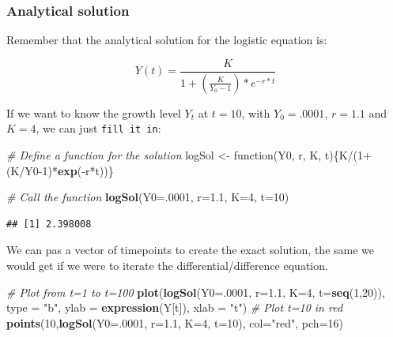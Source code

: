 \documentclass[]{book}
\newenvironment{Shaded}{\begin{snugshade}}{\end{snugshade}}
\newcommand{\KeywordTok}[1]{\textcolor[rgb]{0.13,0.29,0.53}{\textbf{{#1}}}}
\newcommand{\DataTypeTok}[1]{\textcolor[rgb]{0.13,0.29,0.53}{{#1}}}
\newcommand{\DecValTok}[1]{\textcolor[rgb]{0.00,0.00,0.81}{{#1}}}
\newcommand{\FloatTok}[1]{\textcolor[rgb]{0.00,0.00,0.81}{{#1}}}
\newcommand{\StringTok}[1]{\textcolor[rgb]{0.31,0.60,0.02}{{#1}}}
\newcommand{\CommentTok}[1]{\textcolor[rgb]{0.56,0.35,0.01}{\textit{{#1}}}}
\newcommand{\NormalTok}[1]{{#1}}
\begin{document}
\subsubsection*{Analytical solution}\label{analytical-solution}

Remember that the analytical solution for the logistic equation is:

\[
Y(t)  =  \frac{K}{1 + \left(\frac{K}{Y_{0} - 1}\right) * e^{-r*t} }
\]

If we want to know the growth level \(Y_t\) at \(t=10\), with
\(Y_0=.0001\), \(r=1.1\) and \(K=4\), we can just \texttt{fill\ it\ in}:

\begin{Shaded}
\begin{Highlighting}[]
\CommentTok{# Define a function for the solution}
\NormalTok{logSol <-}\StringTok{ }\NormalTok{function(Y0, r, K, t)\{K/(}\DecValTok{1}\NormalTok{+(K/Y0}\DecValTok{-1}\NormalTok{)*}\KeywordTok{exp}\NormalTok{(-r*t))\}}

\CommentTok{# Call the function}
\KeywordTok{logSol}\NormalTok{(}\DataTypeTok{Y0=}\NormalTok{.}\DecValTok{0001}\NormalTok{, }\DataTypeTok{r=}\FloatTok{1.1}\NormalTok{, }\DataTypeTok{K=}\DecValTok{4}\NormalTok{, }\DataTypeTok{t=}\DecValTok{10}\NormalTok{)}
\end{Highlighting}
\end{Shaded}

\begin{verbatim}
## [1] 2.398008
\end{verbatim}

We can pas a vector of timepoints to create the exact solution, the same
we would get if we were to iterate the differential/difference equation.

\begin{Shaded}
\begin{Highlighting}[]
\CommentTok{# Plot from t=1 to t=100}
\KeywordTok{plot}\NormalTok{(}\KeywordTok{logSol}\NormalTok{(}\DataTypeTok{Y0=}\NormalTok{.}\DecValTok{0001}\NormalTok{, }\DataTypeTok{r=}\FloatTok{1.1}\NormalTok{, }\DataTypeTok{K=}\DecValTok{4}\NormalTok{, }\DataTypeTok{t=}\KeywordTok{seq}\NormalTok{(}\DecValTok{1}\NormalTok{,}\DecValTok{20}\NormalTok{)), }\DataTypeTok{type =} \StringTok{"b"}\NormalTok{, }
     \DataTypeTok{ylab =} \KeywordTok{expression}\NormalTok{(Y[t]), }\DataTypeTok{xlab =} \StringTok{"t"}\NormalTok{)}
\CommentTok{# Plot t=10 in red}
\KeywordTok{points}\NormalTok{(}\DecValTok{10}\NormalTok{,}\KeywordTok{logSol}\NormalTok{(}\DataTypeTok{Y0=}\NormalTok{.}\DecValTok{0001}\NormalTok{, }\DataTypeTok{r=}\FloatTok{1.1}\NormalTok{, }\DataTypeTok{K=}\DecValTok{4}\NormalTok{, }\DataTypeTok{t=}\DecValTok{10}\NormalTok{), }\DataTypeTok{col=}\StringTok{"red"}\NormalTok{, }\DataTypeTok{pch=}\DecValTok{16}\NormalTok{)}
\end{Highlighting}
\end{Shaded}
\end{document}
